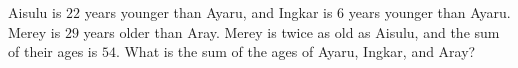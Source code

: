 Aisulu is $22$ years younger than Ayaru, and Ingkar is $6$ years younger than Ayaru. Merey is $29$ years older than Aray. Merey is twice as old as Aisulu, and the sum of their ages is $54$. What is the sum of the ages of Ayaru, Ingkar, and Aray?
